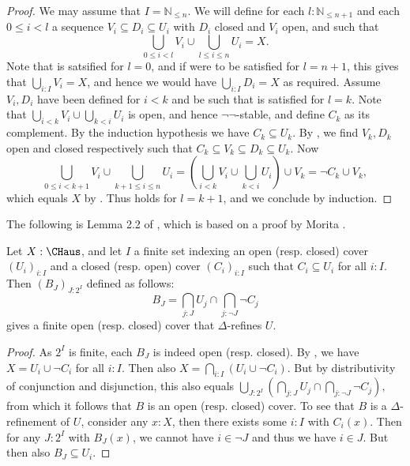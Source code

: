 \begin{proof}
  We may assume that $I = \mathbb N_{\leq n}$. We will define for each $l:\mathbb N_{\leq n+1}$ and each $0\leq i < l$ a sequence $V_i \subseteq D_i \subseteq U_i$ with $D_i$ closed and $V_i$ open, and such that
  \begin{equation}\label{inductionLoop}\bigcup_{0 \leq i < l} V_i \cup \bigcup_{l\leq  i\leq n} U_i = X.\end{equation}
  Note that  is satsified for $l=0$, and if were to be satisfied for $l=n+1$, this gives that $\bigcup_{i:I} V_i = X$, and hence we would have $\bigcup_{i:I} D_i = X$ as required. 
%
  Assume $V_i,D_i$ have been defined for $i<k$ and be such that  is satisfied for $l=k$. 
  Note that $\bigcup_{i<k} V_i \cup \bigcup_{k<i} U_i$ is open, and hence $\neg\neg$-stable, and define $C_k$ as its complement. By the induction hypothesis we have $C_k \subseteq U_k$. By , we find $V_k,D_k$ open and closed respectively such that 
  $C_k \subseteq V_k \subseteq D_k \subseteq U_k$. 
  Now
  $$
  \bigcup_{0\leq i< k+1} V_i \cup \bigcup_{k+1\leq i \leq n} U_i = 
  (\bigcup_{i<k}V_i \cup 
  \bigcup_{k<i} U_i)
  \cup V_k 
  = 
  \neg C_k \cup V_k,
  $$
  which equals $X$ by . 
  Thus  holds for $l=k+1$, and we conclude by induction. 
\end{proof}

The following is Lemma 2.2 of \cite{Howes}, which is based on a proof by Morita \cite{MoritaStar}. 
\begin{lemma}\label{Morita}
  Let $X:\CHaus$, and let $I$ a finite set indexing an open (resp. closed) cover $(U_i)_{i:I}$ and a closed (resp. open) cover $(C_i)_{i:I}$ such that $C_i \subseteq U_i$ for all $i:I$. 
  Then $(B_J)_{J:2^I}$ defined as follows:
  $$B_J = \bigcap_{j:J} U_j \cap \bigcap_{j:\neg J} \neg C_j$$
  gives a finite open (resp. closed) cover that $\Delta$-refines $U$. 
\end{lemma}
\begin{proof}
  As $2^I$ is finite, each $B_J$ is indeed open (resp. closed). 
  By , we have $X = U_i \cup \neg C_i$ for all $i:I$. Then also
  $X = \bigcap_{i:I} (U_i \cup \neg C_i)$. 
  But by distributivity of conjunction and disjunction, this also equals
  $
  \bigcup_{J:2^I} \left(\bigcap_{j:J} U_j \cap \bigcap_{j:\neg J} \neg C_j\right),
  $
  from which it follows that $B$ is an open (resp. closed) cover.
  To see that $B$ is a $\Delta$-refinement of $U$, consider any $x:X$, then there exists some $i:I$ with $C_i(x)$. 
  Then for any $J:2^I$ with $B_J(x)$, we cannot have $i \in \neg J$ and thus we have $i\in J$. But then also $B_J\subseteq U_i$.
\end{proof}

